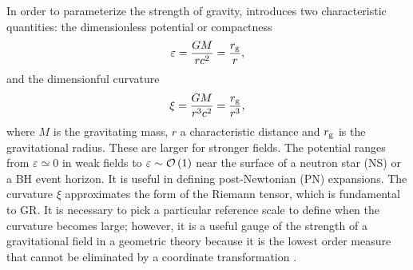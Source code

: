 In order to parameterize the strength of gravity, \citet{Psaltis2008a} introduces two characteristic quantities: the dimensionless potential or compactness \citep{Yunes2013}
\begin{equation}
\varepsilon = \dfrac{GM}{rc^2} = \dfrac{r_\mathrm{g}}{r},
\end{equation}
and the dimensionful curvature
\begin{equation}
\xi = \dfrac{GM}{r^3c^2} = \dfrac{r_\mathrm{g}}{r^3},
\end{equation}
where $M$ is the gravitating mass, $r$ a characteristic distance and $r_\mathrm{g}$ is the gravitational radius. These are larger for stronger fields. The potential ranges from $\varepsilon \simeq 0$ in weak fields to $\varepsilon \sim \mathcal{O}\left({1}\right)$ near the surface of a neutron star (NS) or a BH event horizon. It is useful in defining post-Newtonian (PN) expansions. The curvature $\xi$ approximates the form of the Riemann tensor, which is fundamental to GR. It is necessary to pick a particular reference scale to define when the curvature becomes large; however, it is a useful gauge of the strength of a gravitational field in a geometric theory because it is the lowest order measure that cannot be eliminated by a coordinate transformation \citep[chapter 7]{Hobson2006}.

